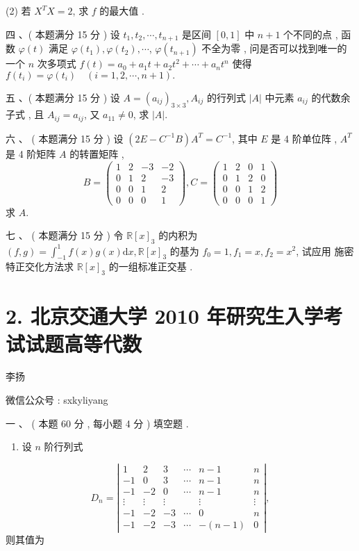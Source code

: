 \documentclass[10pt]{article}
\begin{document}
{(2)  若  $X^{T} X=2$,  求  $f$  的最大值 .

 四 、( 本题满分  15  分 )  设  $t_{1}, t_{2}, \cdots, t_{n+1}$  是区间  $[0,1]$  中  $n+1$  个不同的点 ,  函数  $\varphi(t)$  满足  $\varphi\left(t_{1}\right), \varphi\left(t_{2}\right), \cdots$, $\varphi\left(t_{n+1}\right)$  不全为零 ,  问是否可以找到唯一的一个  $n$  次多项式  $f(t)=a_{0}+a_{1} t+a_{2} t^{2}+\cdots+a_{n} t^{n}$  使得  $f\left(t_{i}\right)=\varphi\left(t_{i}\right) \quad(i=1,2, \cdots, n+1) .$

 五 、( 本题满分  15  分 )  设  $A=\left(a_{i j}\right)_{3 \times 3}, A_{i j}$  的行列式  $|A|$  中元素  $a_{i j}$  的代数余子式 ,  且  $A_{i j}=a_{i j}$,  又  $a_{11} \neq 0$,  求  $|A|$.

 六 、 ( 本题满分  15  分 )  设  $\left(2 E-C^{-1} B\right) A^{T}=C^{-1}$,  其中  $E$  是  4  阶单位阵 , $A^{T}$  是  4  阶矩阵  $A$  的转置矩阵 ,
$$
B=\left(\begin{array}{cccc}
1 & 2 & -3 & -2 \\
0 & 1 & 2 & -3 \\
0 & 0 & 1 & 2 \\
0 & 0 & 0 & 1
\end{array}\right), C=\left(\begin{array}{cccc}
1 & 2 & 0 & 1 \\
0 & 1 & 2 & 0 \\
0 & 0 & 1 & 2 \\
0 & 0 & 0 & 1
\end{array}\right)
$$
 求  $A$.

 七 、 ( 本题满分  15  分 )  令  $\mathbb{R}[x]_{3}$  的内积为  $(f, g)=\int_{-1}^{1} f(x) g(x) \mathrm{d} x, \mathbb{R}[x]_{3}$  的基为  $f_{0}=1, f_{1}=x, f_{2}=x^{2}$,  试应用   施密特正交化方法求  $\mathbb{R}[x]_{3}$  的一组标准正交基 .

\section{2. 北京交通大学 2010 年研究生入学考试试题高等代数}
 李扬 

 微信公众号 : sxkyliyang

 一 、 ( 本题  60  分 ,  每小题  4  分 )  填空题 .

\begin{enumerate}
  \item  设  $n$  阶行列式 
\end{enumerate}
$$
D_{n}=\left|\begin{array}{cccccc}
1 & 2 & 3 & \cdots & n-1 & n \\
-1 & 0 & 3 & \cdots & n-1 & n \\
-1 & -2 & 0 & \cdots & n-1 & n \\
\vdots & \vdots & \vdots & & \vdots & \vdots \\
-1 & -2 & -3 & \cdots & 0 & n \\
-1 & -2 & -3 & \cdots & -(n-1) & 0
\end{array}\right|,
$$
 则其值为 

}
\end{document}
